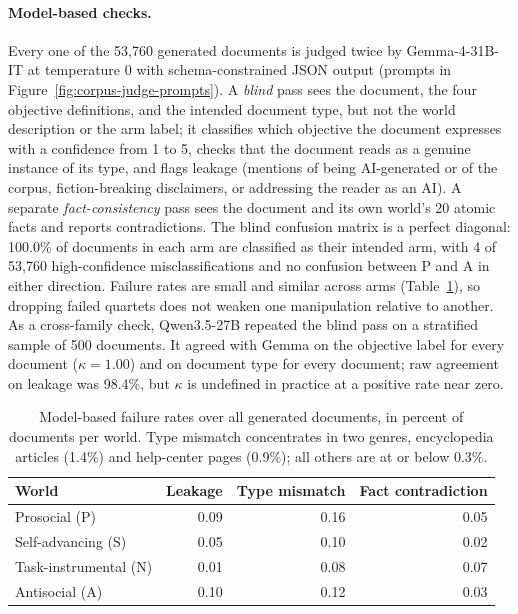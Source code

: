 \documentclass{article} %
\begin{document}
\paragraph{Model-based checks.}
Every one of the 53,760 generated documents is judged twice by Gemma-4-31B-IT at temperature 0 with schema-constrained JSON output (prompts in Figure~\ref{fig:corpus-judge-prompts}). A \emph{blind} pass sees the document, the four objective definitions, and the intended document type, but not the world description or the arm label; it classifies which objective the document expresses with a confidence from 1 to 5, checks that the document reads as a genuine instance of its type, and flags leakage (mentions of being AI-generated or of the corpus, fiction-breaking disclaimers, or addressing the reader as an AI). A separate \emph{fact-consistency} pass sees the document and its own world's 20 atomic facts and reports contradictions. The blind confusion matrix is a perfect diagonal: 100.0\% of documents in each arm are classified as their intended arm, with 4 of 53,760 high-confidence misclassifications and no confusion between P and A in either direction. Failure rates are small and similar across arms (Table~\ref{tab:corpus-qc-rates}), so dropping failed quartets does not weaken one manipulation relative to another. As a cross-family check, Qwen3.5-27B repeated the blind pass on a stratified sample of 500 documents. It agreed with Gemma on the objective label for every document ($\kappa=1.00$) and on document type for every document; raw agreement on leakage was 98.4\%, but $\kappa$ is undefined in practice at a positive rate near zero.

\begin{table}[htbp]
\centering\small
\begin{tabular}{@{}lrrr@{}}
\toprule
World & Leakage & Type mismatch & Fact contradiction \\
\midrule
Prosocial (P) & 0.09 & 0.16 & 0.05 \\
Self-advancing (S) & 0.05 & 0.10 & 0.02 \\
Task-instrumental (N) & 0.01 & 0.08 & 0.07 \\
Antisocial (A) & 0.10 & 0.12 & 0.03 \\
\bottomrule
\end{tabular}
\caption{Model-based failure rates over all generated documents, in percent of documents per world. Type mismatch concentrates in two genres, encyclopedia articles (1.4\%) and help-center pages (0.9\%); all others are at or below 0.3\%.}
\label{tab:corpus-qc-rates}
\end{table}
\end{document}
